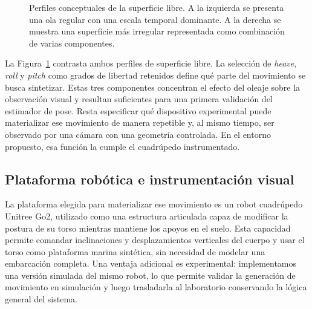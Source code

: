 \documentclass[12pt,a4paper]{report}
\begin{document}
\begin{figure}[H]
\centering
\begin{minipage}[t]{0.47\textwidth}
\centering
{}
\end{minipage}
\hfill
\begin{minipage}[t]{0.47\textwidth}
\centering
{}
\end{minipage}
\caption{Perfiles conceptuales de la superficie libre. A la izquierda se presenta
una ola regular con una escala temporal dominante. A la derecha se muestra una
superficie más irregular representada como combinación de varias componentes.}
\label{fig:wave_regular_irregular}
\end{figure}

La Figura~\ref{fig:wave_regular_irregular} contrasta ambos perfiles de
superficie libre. La selección de \emph{heave}, \emph{roll} y \emph{pitch} como
grados de libertad retenidos define qué parte del movimiento se busca sintetizar.
Estas tres componentes concentran el efecto del oleaje sobre la observación
visual y resultan suficientes para una primera validación del estimador de pose.
Resta especificar qué dispositivo experimental puede materializar ese movimiento
de manera repetible y, al mismo tiempo, ser observado por una cámara con una
geometría controlada. En el entorno propuesto, esa función la cumple el
cuadrúpedo instrumentado.

\subsection{Plataforma robótica e instrumentación visual}

La plataforma elegida para materializar ese movimiento es un robot cuadrúpedo
Unitree Go2, utilizado como una estructura articulada capaz de modificar la
postura de su torso mientras mantiene los apoyos en el suelo. Esta capacidad
permite comandar inclinaciones y desplazamientos verticales del cuerpo y usar el
torso como plataforma marina sintética, sin necesidad de modelar una embarcación
completa. Una ventaja adicional es experimental: implementamos una versión
simulada del mismo robot, lo que permite validar la generación de movimiento en
simulación y luego trasladarla al laboratorio conservando la lógica general del
sistema.
\end{document}
